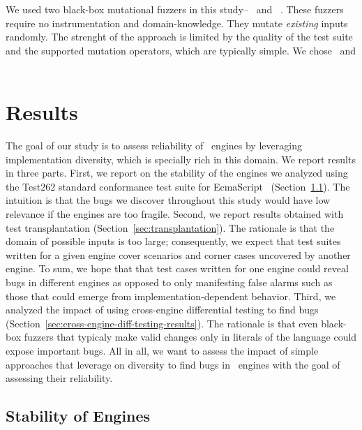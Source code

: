 \documentclass[10pt,conference,anonymous]{IEEEtran}
\begin{document}
We used two black-box mutational fuzzers in this
study--\radamsa~\cite{radamsa} and \quickfuzz~\cite{quickfuzz}. These
fuzzers require no instrumentation and domain-knowledge. They mutate
\emph{existing} inputs randomly. The strenght of the approach is
limited by the quality of the test suite and the supported mutation
operators, which are typically simple. We chose \radamsa\ and
\quickfuzz\  


\section{Results}
\label{sec:results}

The goal of our study is to assess reliability of \js\ engines by
leveraging implementation diversity, which is specially rich in this
domain. We report results in three parts. First, we report on the
stability of the engines we analyzed using the Test262 standard
conformance test suite for EcmaScript~\cite{ecma262-conformance-suite}
(Section~\ref{sec:stability}). The intuition is that the bugs we
discover throughout this study would have low relevance if the engines
are too fragile. Second, we report results obtained with test
transplantation (Section~\ref{sec:transplantation}). The rationale is
that the domain of possible inputs is too large; consequently, we
expect that test suites written for a given engine cover scenarios and
corner cases uncovered by another engine. To sum, we hope that that
test cases written for one engine could reveal bugs in different
engines as opposed to only manifesting false alarms such as those that
could emerge from implementation-dependent behavior. Third, we
analyzed the impact of using cross-engine differential testing to find
bugs (Section~\ref{sec:cross-engine-diff-testing-results}). The
rationale is that even black-box fuzzers that typicaly make valid
changes only in literals of the language could expose important
bugs. All in all, we want to assess the impact of simple approaches
that leverage on diversity to find bugs in \js\ engines with the goal
of assessing their reliability.

\subsection{Stability of Engines}
\label{sec:stability}
\end{document}
